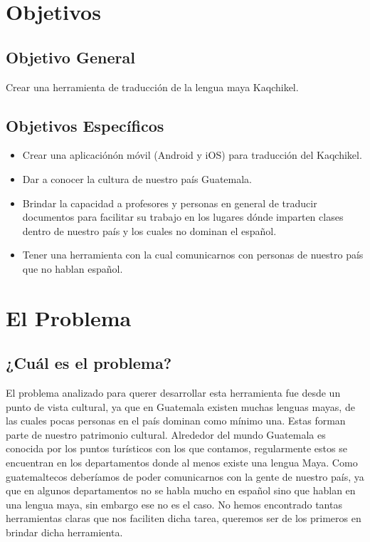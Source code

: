 \documentclass[a4paper,openright,11pt]{article}
\begin{document}
\section{Objetivos}
\subsection{Objetivo General}
Crear una herramienta de traducción de la lengua maya Kaqchikel.
\subsection{Objetivos Espec\'ificos}
\begin{itemize}
    \item Crear una aplicación\'on móvil (Android y iOS) para traducción del Kaqchikel.
    \item Dar a conocer la cultura de nuestro pa\'is Guatemala.
    \item Brindar la capacidad a profesores y personas en general de traducir documentos para facilitar su trabajo en los lugares d\'onde imparten clases dentro de nuestro pa\'is y los cuales no dominan el español.
    \item Tener una herramienta con la cual comunicarnos con personas de nuestro país que no hablan español.
\end{itemize}
\newpage

\section{El Problema}
\subsection{¿Cuál es el problema?}
El problema analizado para querer desarrollar esta herramienta fue desde un punto de vista cultural, ya que en Guatemala existen muchas lenguas mayas, de las cuales pocas personas en el pa\'is dominan como mínimo una. Estas forman parte de nuestro patrimonio cultural. Alrededor del mundo Guatemala es conocida por los puntos turísticos con los que contamos, regularmente estos se encuentran en los departamentos donde al menos existe una lengua Maya.  Como guatemaltecos deberíamos de poder comunicarnos con la gente de nuestro pa\'is, ya que en algunos departamentos no se habla mucho en español sino que hablan en una lengua maya, sin embargo ese no es el caso. No hemos encontrado tantas herramientas claras que nos faciliten dicha tarea, queremos ser de los primeros en brindar dicha herramienta.\\
\end{document}
